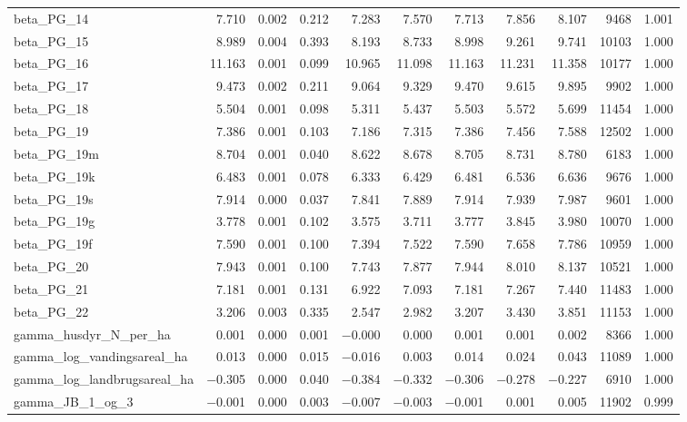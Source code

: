 \documentclass[12pt]{article}
\begin{document}
\begin{longtable}{lrrrrrrrrrr}
beta\_PG\_14  &  7.710 & 0.002 & 0.212 &  7.283 &  7.570 &  7.713 &  7.856 &  8.107 &  9468 & 1.001 \\
beta\_PG\_15  &  8.989 & 0.004 & 0.393 &  8.193 &  8.733 &  8.998 &  9.261 &  9.741 & 10103 & 1.000 \\
beta\_PG\_16  & 11.163 & 0.001 & 0.099 & 10.965 & 11.098 & 11.163 & 11.231 & 11.358 & 10177 & 1.000 \\
beta\_PG\_17  &  9.473 & 0.002 & 0.211 &  9.064 &  9.329 &  9.470 &  9.615 &  9.895 &  9902 & 1.000 \\
beta\_PG\_18  &  5.504 & 0.001 & 0.098 &  5.311 &  5.437 &  5.503 &  5.572 &  5.699 & 11454 & 1.000 \\
beta\_PG\_19  &  7.386 & 0.001 & 0.103 &  7.186 &  7.315 &  7.386 &  7.456 &  7.588 & 12502 & 1.000 \\
beta\_PG\_19m &  8.704 & 0.001 & 0.040 &  8.622 &  8.678 &  8.705 &  8.731 &  8.780 &  6183 & 1.000 \\
beta\_PG\_19k &  6.483 & 0.001 & 0.078 &  6.333 &  6.429 &  6.481 &  6.536 &  6.636 &  9676 & 1.000 \\
beta\_PG\_19s &  7.914 & 0.000 & 0.037 &  7.841 &  7.889 &  7.914 &  7.939 &  7.987 &  9601 & 1.000 \\
beta\_PG\_19g &  3.778 & 0.001 & 0.102 &  3.575 &  3.711 &  3.777 &  3.845 &  3.980 & 10070 & 1.000 \\
beta\_PG\_19f &  7.590 & 0.001 & 0.100 &  7.394 &  7.522 &  7.590 &  7.658 &  7.786 & 10959 & 1.000 \\
beta\_PG\_20  &  7.943 & 0.001 & 0.100 &  7.743 &  7.877 &  7.944 &  8.010 &  8.137 & 10521 & 1.000 \\
beta\_PG\_21  &  7.181 & 0.001 & 0.131 &  6.922 &  7.093 &  7.181 &  7.267 &  7.440 & 11483 & 1.000 \\
beta\_PG\_22  &  3.206 & 0.003 & 0.335 &  2.547 &  2.982 &  3.207 &  3.430 &  3.851 & 11153 & 1.000 \\
\addlinespace
gamma\_husdyr\_N\_per\_ha        &  0.001 & 0.000 & 0.001 & $-$0.000 &  0.000 &  0.001 &  0.001 &  0.002 &  8366 & 1.000 \\
gamma\_log\_vandingsareal\_ha   &  0.013 & 0.000 & 0.015 & $-$0.016 &  0.003 &  0.014 &  0.024 &  0.043 & 11089 & 1.000 \\
gamma\_log\_landbrugsareal\_ha  & $-$0.305 & 0.000 & 0.040 & $-$0.384 & $-$0.332 & $-$0.306 & $-$0.278 & $-$0.227 &  6910 & 1.000 \\
gamma\_JB\_1\_og\_3  & $-$0.001 & 0.000 & 0.003 & $-$0.007 & $-$0.003 & $-$0.001 &  0.001 &  0.005 & 11902 & 0.999 \\

\end{longtable}
\end{document}
